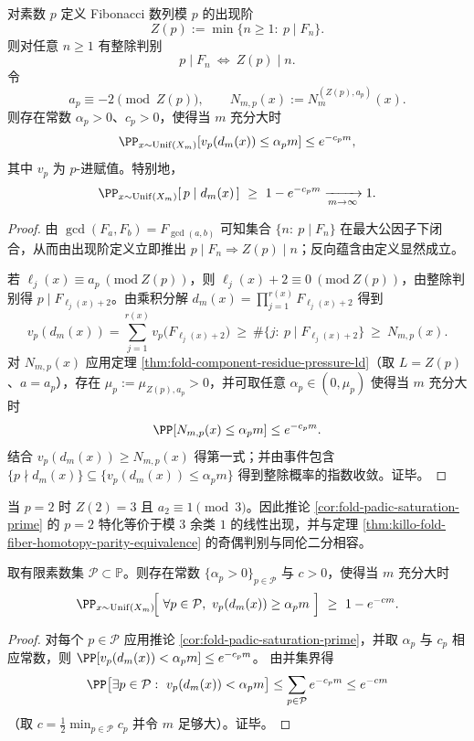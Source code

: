 \begin{corollary}\label{cor:fold-padic-saturation-prime}
对素数 \(p\) 定义 Fibonacci 数列模 \(p\) 的出现阶
\[
Z(p):=\min\{n\ge 1:\ p\mid F_n\}.
\]
则对任意 \(n\ge 1\) 有整除判别
\[
p\mid F_n\ \Longleftrightarrow\ Z(p)\mid n.
\]
令
\[
a_p\equiv -2\pmod{Z(p)},\qquad N_{m,p}(x):=N_m^{(Z(p),a_p)}(x).
\]
则存在常数 \(\alpha_p>0\)、\(c_p>0\)，使得当 \(m\) 充分大时
\[
\PP_{x\sim \mathrm{Unif}(X_m)}\!\left[v_p(d_m(x))\le \alpha_p m\right]\le e^{-c_p m},
\]
其中 \(v_p\) 为 \(p\)-进赋值。特别地，
\[
\PP_{x\sim \mathrm{Unif}(X_m)}[\,p\mid d_m(x)\,]\ \ge\ 1-e^{-c_p m}\xrightarrow[m\to\infty]{}1.
\]
\end{corollary}
\begin{proof}
由 \(\gcd(F_a,F_b)=F_{\gcd(a,b)}\) 可知集合 \(\{n:\ p\mid F_n\}\) 在最大公因子下闭合，从而由出现阶定义立即推出 \(p\mid F_n\Rightarrow Z(p)\mid n\)；反向蕴含由定义显然成立。

若 \(\ell_j(x)\equiv a_p\ (\mathrm{mod}\ Z(p))\)，则 \(\ell_j(x)+2\equiv 0\ (\mathrm{mod}\ Z(p))\)，由整除判别得 \(p\mid F_{\ell_j(x)+2}\)。由乘积分解
\(
d_m(x)=\prod_{j=1}^{r(x)}F_{\ell_j(x)+2}
\)
得到
\[
v_p(d_m(x))=\sum_{j=1}^{r(x)} v_p\!\bigl(F_{\ell_j(x)+2}\bigr)\ \ge\ \#\{j:\ p\mid F_{\ell_j(x)+2}\}\ \ge\ N_{m,p}(x).
\]
对 \(N_{m,p}(x)\) 应用定理 \ref{thm:fold-component-residue-pressure-ld}（取 \(L=Z(p)\)、\(a=a_p\)），存在 \(\mu_p:=\mu_{Z(p),a_p}>0\)，并可取任意 \(\alpha_p\in(0,\mu_p)\) 使得当 \(m\) 充分大时
\[
\PP\!\left[N_{m,p}(x)\le \alpha_p m\right]\le e^{-c_p m}.
\]
结合 \(v_p(d_m(x))\ge N_{m,p}(x)\) 得第一式；并由事件包含
\(
\{p\nmid d_m(x)\}\subseteq \{v_p(d_m(x))\le \alpha_p m\}
\)
得到整除概率的指数收敛。证毕。
\end{proof}

\begin{remark}\label{rem:fold-2adic-saturation-mod3}
当 \(p=2\) 时 \(Z(2)=3\) 且 \(a_2\equiv 1\pmod 3\)。因此推论 \ref{cor:fold-padic-saturation-prime} 的 \(p=2\) 特化等价于模 \(3\) 余类 \(1\) 的线性出现，并与定理 \ref{thm:killo-fold-fiber-homotopy-parity-equivalence} 的奇偶判别与同伦二分相容。
\end{remark}

\begin{corollary}[有限素数集的同步线性饱和]\label{cor:fold-padic-saturation-finite-set}
取有限素数集 \(\mathcal P\subset\mathbb P\)。则存在常数 \(\{\alpha_p>0\}_{p\in\mathcal P}\) 与 \(c>0\)，使得当 \(m\) 充分大时
\[
\PP_{x\sim \mathrm{Unif}(X_m)}\!\Big[\ \forall p\in\mathcal P,\ v_p(d_m(x))\ge \alpha_p m\ \Big]\ \ge\ 1-e^{-c m}.
\]
\end{corollary}
\begin{proof}
对每个 \(p\in\mathcal P\) 应用推论 \ref{cor:fold-padic-saturation-prime}，并取 \(\alpha_p\) 与 \(c_p\) 相应常数，则
\(
\PP[v_p(d_m(x))<\alpha_p m]\le e^{-c_p m}
\)。
由并集界得
\[
\PP\bigl[\exists p\in\mathcal P:\ v_p(d_m(x))<\alpha_p m\bigr]
\le \sum_{p\in\mathcal P} e^{-c_p m}
\le e^{-c m}
\]
（取 \(c=\frac12\min_{p\in\mathcal P}c_p\) 并令 \(m\) 足够大）。证毕。
\end{proof}

